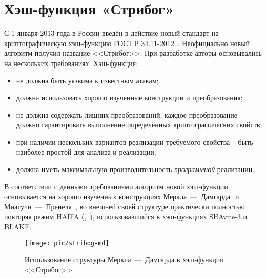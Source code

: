 \section{Хэш-функция «Стрибог»}\label{section-stribog}

С 1 января 2013 года в России введён в действие новый стандарт на криптографическую хэш-функцию ГОСТ Р 34.11-2012~\cite{GOST-R:34.11-2012}. Неофициально новый алгоритм получил название <<Стрибог>>. При разработке авторы основывались на нескольких требованиях. Хэш-функция:

\begin{itemize}
	\item не должна быть уязвима к известным атакам;
	\item должна использовать хорошо изученные конструкции и преобразования;
	\item не должна содержать лишних преобразований, каждое преобразование должно гарантировать выполнение определённых криптографических свойств;
	\item при наличии нескольких вариантов реализации требуемого свойства -- быть наиболее простой для анализа и реализации;
	\item должна иметь максимальную производительность \emph{программной} реализации.
\end{itemize}

В соответствии с данными требованиями алгоритм новой хэш-функции основывается на хорошо изученных конструкциях Меркла~---~Дамгарда~\cite{Merkle:1979, Merkle:1990, Damgard:1990} и Миагучи~---~Пренеля~\cite{Espen:Mieghem:1989, Miyaguchi:Ohta:Iwata:1990:03, Miyaguchi:Ohta:Iwata:1990:11}, во внешней своей структуре практически полностью повторяя режим HAIFA (,~\cite{Biham:Dunkelman:2007}), использовавшийся в хэш-функциях SHAvite-3 и BLAKE.

\begin{figure}[htb]
	\centering
	\texttt{[image: pic/stribog-md]}
  \caption{Использование структуры Меркла~---~Дамгарда в хэш-функции <<Стрибог>>}
  \label{fig:stribog-md}
\end{figure}


